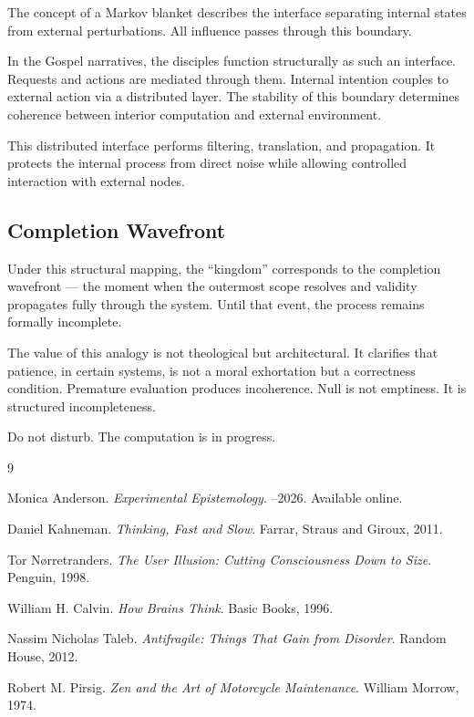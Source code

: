 \documentclass[12pt]{article}
\begin{document}
The concept of a Markov blanket describes the interface separating internal states from external perturbations. All influence passes through this boundary.

In the Gospel narratives, the disciples function structurally as such an interface. Requests and actions are mediated through them. Internal intention couples to external action via a distributed layer. The stability of this boundary determines coherence between interior computation and external environment.

This distributed interface performs filtering, translation, and propagation. It protects the internal process from direct noise while allowing controlled interaction with external nodes.

\subsection*{Completion Wavefront}

Under this structural mapping, the ``kingdom'' corresponds to the completion wavefront — the moment when the outermost scope resolves and validity propagates fully through the system. Until that event, the process remains formally incomplete.

The value of this analogy is not theological but architectural. It clarifies that patience, in certain systems, is not a moral exhortation but a correctness condition. Premature evaluation produces incoherence. Null is not emptiness. It is structured incompleteness.

Do not disturb. The computation is in progress.


\begin{thebibliography}{9}

Monica Anderson.
\newblock \emph{Experimental Epistemology}.
--2026. Available online.

Daniel Kahneman.
\newblock \emph{Thinking, Fast and Slow}.
\newblock Farrar, Straus and Giroux, 2011.

Tor N{\o}rretranders.
\newblock \emph{The User Illusion: Cutting Consciousness Down to Size}.
\newblock Penguin, 1998.

William H. Calvin.
\newblock \emph{How Brains Think}.
\newblock Basic Books, 1996.

Nassim Nicholas Taleb.
\newblock \emph{Antifragile: Things That Gain from Disorder}.
\newblock Random House, 2012.

Robert M. Pirsig.
\newblock \emph{Zen and the Art of Motorcycle Maintenance}.
\newblock William Morrow, 1974.

\end{thebibliography}
\end{document}
